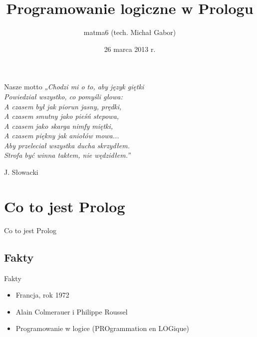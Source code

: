 \documentclass[blue]{beamer}
\author{matma6 (tech. Michał Gabor)}
\title{Programowanie logiczne w Prologu}
\date{26 marca 2013 r.}
\newcommand{\tytul}[1]{\begin{frame}\begin{center}\begin{Huge}#1\end{Huge}\end{center}\end{frame}}
\begin{document}
\begin{frame}
\titlepage
\end{frame}
\begin{frame}{Nasze motto}
\textit{
„Chodzi mi o to, aby język giętki\\Powiedział wszystko, co pomyśli głowa:\\A czasem był jak piorun jasny, prędki,\\A czasem smutny jako pieśń stepowa,\\A czasem jako skarga nimfy miętki,\\A czasem piękny jak aniołów mowa...\\Aby przeleciał wszystka ducha skrzydłem.\\Strofa być winna taktem, nie wędzidłem.”}
\begin{flushright}
J. Słowacki
\end{flushright}
\end{frame}
\begin{frame}
\tableofcontents
\end{frame}
\section{Co to jest Prolog}
\tytul{Co to jest Prolog}
\subsection{Fakty}
\begin{frame}{Fakty}
\begin{itemize}
\item Francja, rok 1972
\item Alain Colmerauer i Philippe Roussel
\item Programowanie w logice (PROgrammation en LOGique)
\end{itemize}
\end{frame}
\end{document}
